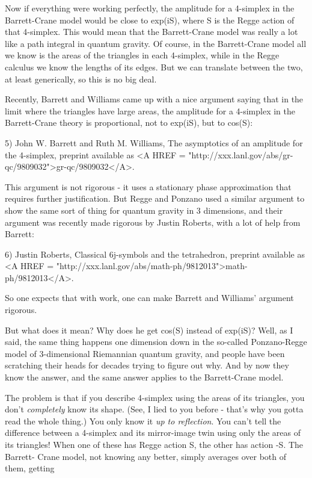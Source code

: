 Now if everything were working perfectly, the amplitude for a 4-simplex
in the Barrett-Crane model would be close to exp(iS), where S is the
Regge action of that 4-simplex.   This would mean that the Barrett-Crane
model was really a lot like a path integral in quantum gravity.  Of
course, in the Barrett-Crane model all we know is the areas of the triangles 
in each 4-simplex, while in the Regge calculus we know the lengths of
its edges.  But we can translate between the two, at least generically,
so this is no big deal.

Recently, Barrett and Williams
came up with a nice argument saying that in the limit
where the triangles have large areas, the amplitude for a 4-simplex in
the Barrett-Crane theory is proportional, not to exp(iS), but to cos(S):

5) John W. Barrett and Ruth M. Williams, The asymptotics of an amplitude 
for the 4-simplex, preprint available as 
<A HREF = "http://xxx.lanl.gov/abs/gr-qc/9809032">gr-qc/9809032</A>.

This argument is not rigorous - it uses a stationary phase approximation
that requires further justification.  But Regge and Ponzano used a
similar argument to show the same sort of thing for quantum gravity in 3
dimensions, and their argument was recently made rigorous by Justin
Roberts, with a lot of help from Barrett:

6) Justin Roberts, Classical 6j-symbols and the tetrahedron, preprint
available as 
<A HREF = "http://xxx.lanl.gov/abs/math-ph/9812013">math-ph/9812013</A>.

So one expects that with work, one can make Barrett and
Williams' argument rigorous.

But what does it mean?  Why does he get cos(S) instead of exp(iS)? 
Well, as I said, the same thing happens one dimension down in the
so-called Ponzano-Regge model of 3-dimensional Riemannian quantum
gravity, and people have been scratching their heads for decades trying
to figure out why.  And by now they know the answer, and the same
answer applies to the Barrett-Crane model.  

The problem is that if you describe 4-simplex using the areas of its
triangles, you don't \emph{completely} know its shape.  (See, I lied to you
before - that's why you gotta read the whole thing.)  You only know it
\emph{up to reflection}.  You can't tell the difference between a 4-simplex
and its mirror-image twin using only the areas of its triangles!  When
one of these has Regge action S, the other has action -S.  The Barrett-
Crane model, not knowing any better, simply averages over both of them, 
getting 

